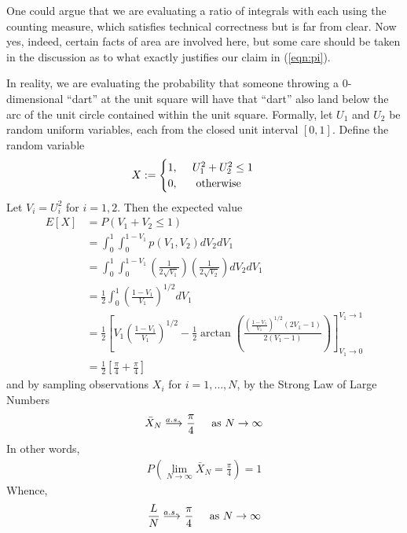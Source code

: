 One could argue that we are evaluating a ratio of integrals with each using the counting measure, which satisfies technical correctness but is far from clear.  Now yes, indeed, certain facts of area are involved here, but some care should be taken in the discussion as to what exactly justifies our claim in (\ref{eqn:pi}).

In reality, we are evaluating the probability that someone throwing a 0-dimensional ``dart'' at the unit square will have that ``dart'' also land below the arc of the unit circle contained within the unit square.  Formally, let $U_1$ and $U_2$ be random uniform variables, each from the closed unit interval $[0, 1]$.  Define the random variable
\begin{align*}
X &:= 
\begin{cases} 
1\text{, } \hspace{.4cm} U_1^2 + U_2^2 \leq 1\\ 
0\text{, \hspace{.4cm} otherwise}
\end{cases}
\end{align*}
Let $V_i = U_i^2$ for $i=1, 2$. Then the expected value
\begin{align*}
E[X] &= P( V_1 + V_2 \leq 1 )\\
     &= \int_0^1 \int_0^{1-V_1} p(V_1, V_2)dV_2 dV_1\\
     &= \int_0^1 \int_0^{1-V_1} \left( \frac{1}{2\sqrt{V_1}} \right) \left( \frac{1}{2\sqrt{V_2}} \right)dV_2 dV_1\\
     &= \frac{1}{2}\int_0^1 \left(\frac{1-V_1}{V_1}\right)^{1/2}dV_1\\
     &= \frac{1}{2} \left[ 
	V_1\left(\frac{1-V_1}{V_1}\right)^{1/2} 
	 - \frac{1}{2} \arctan\left(\frac{\left(\frac{1-V_1}{V_1}\right)^{1/2} (2V_1-1)}{2(V_1-1)}\right) 
	\right]_{V_1\rightarrow 0}^{V_1\rightarrow 1}\\
     &= \frac{1}{2}\left[ \frac{\pi}{4} +\frac{\pi}{4}  \right]
\end{align*}
and by sampling observations $X_i$ for $i=1,\dots,N$, by the Strong Law of Large Numbers
\begin{align*}
\bar{X}_N \longrightarrow^{\hspace{-.55cm} a.s.} \hspace{.1cm} \frac{\pi}{4} \hspace{.4cm} \text{ as } N\rightarrow \infty
\end{align*}
In other words,
\begin{align*}
P\left(\lim_{N\rightarrow\infty} \bar{X}_N = \frac{\pi}{4}\right) = 1
\end{align*}
Whence,
\begin{align*}
\frac{L}{N}  \longrightarrow^{\hspace{-.55cm} a.s.} \hspace{.1cm} \frac{\pi}{4} \hspace{.4cm} \text{ as } N\rightarrow \infty
\end{align*}

